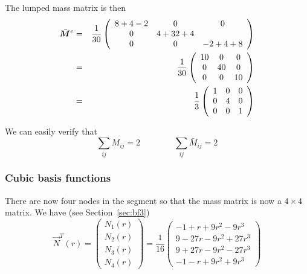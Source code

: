 The lumped mass matrix is then
\begin{eqnarray}
\bar{\bm M}^e 
&=&
\frac{1}{30}
\left(
\begin{array}{ccc}
8 + 4  -2 & 0 & 0\\
0 & 4 + 32 + 4 \\
0 & 0 & -2 + 4 + 8
\end{array}
\right) \nonumber\\
&=&
\frac{1}{30}
\left(
\begin{array}{ccc}
10 & 0 & 0\\
0 & 40 & 0\\
0 & 0 & 10 
\end{array}
\right) \nonumber\\
&=&
\frac{1}{3}
\left(
\begin{array}{ccc}
1 & 0 & 0\\
0 & 4 & 0\\
0 & 0 & 1 
\end{array}
\right) 
\end{eqnarray}

We can easily verify that
\[
\sum_{ij} M_{ij} = 2
\qquad
\qquad
\sum_{ij} \bar{M}_{ij} = 2
\]


\subsubsection{Cubic basis functions}
There are now four nodes in the segment so that the mass matrix 
is now a $4\times4$ matrix. We have (see Section~\ref{sec:bf3}) 
\begin{equation}
{\vec N}^T(r) = 
\left(
\begin{array}{c}
N_1(r) \\ 
N_2(r) \\ 
N_3(r) \\ 
N_4(r) 
\end{array}
\right)
=
\frac{1}{16}
\left(
\begin{array}{c}
 -1+  r+9r^2- 9r^3  \\ 
  9-27r-9r^2+27r^3  \\
  9+27r-9r^2-27r^3  \\
 -1-  r+9r^2+ 9r^3  
\end{array}
\right)
\end{equation}


